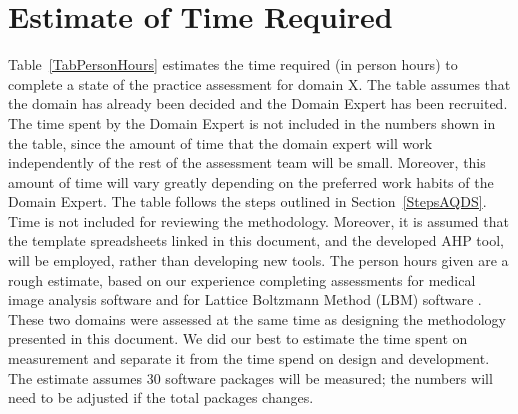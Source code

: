 \documentclass[letterpaper,cleveref]{lipics-v2019}
\begin{document}

\section{Estimate of Time Required} \label{SecEstTimeRequired}

Table~\ref{TabPersonHours} estimates the time required (in person hours) to
complete a state of the practice assessment for domain X.  The table assumes
that the domain has already been decided and the Domain Expert has been
recruited.  The time spent by the Domain Expert is not included in the numbers
shown in the table, since the amount of time that the domain expert will work
independently of the rest of the assessment team will be small.  Moreover, this
amount of time will vary greatly depending on the preferred work habits of the
Domain Expert.  The table follows the steps outlined in Section~\ref{StepsAQDS}.
Time is not included for reviewing the methodology. Moreover, it is assumed that
the template spreadsheets linked in this document, and the developed AHP tool,
will be employed, rather than developing new tools.  The person hours given are
a rough estimate, based on our experience completing assessments for medical
image analysis software \citep{Dong2021} and for Lattice Boltzmann Method (LBM)
software \citep{Michalski2021}.  These two domains were assessed at the same
time as designing the methodology presented in this document.  We did our best
to estimate the time spent on measurement and separate it from the time spend on
design and development.  The estimate assumes 30 software packages will be
measured; the numbers will need to be adjusted if the total packages changes.
\end{document}
